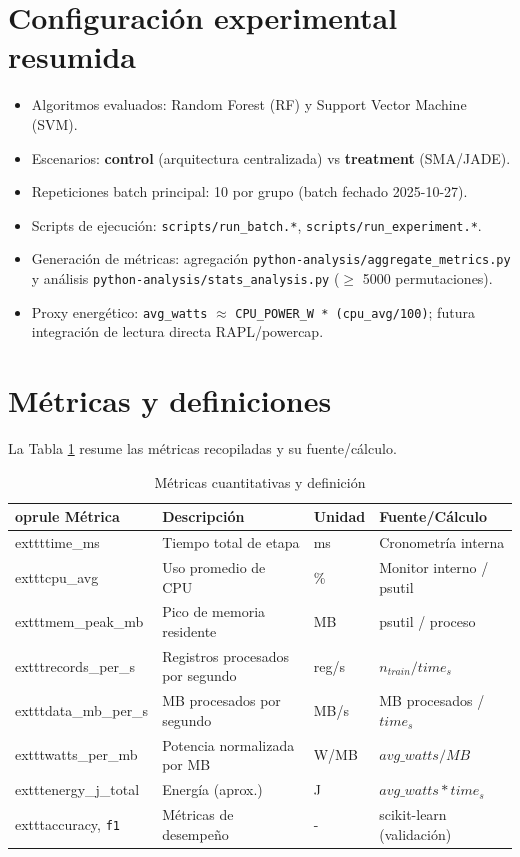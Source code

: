 \documentclass[12pt,oneside]{report}
\begin{document}
    \section{Configuración experimental resumida}
    \begin{itemize}
        \item Algoritmos evaluados: Random Forest (RF) y Support Vector Machine (SVM).
        \item Escenarios: \textbf{control} (arquitectura centralizada) vs \textbf{treatment} (SMA/JADE).
        \item Repeticiones batch principal: 10 por grupo (batch fechado 2025-10-27).
        \item Scripts de ejecución: \texttt{scripts/run\_batch.*}, \texttt{scripts/run\_experiment.*}.
        \item Generación de métricas: agregación \texttt{python-analysis/aggregate\_metrics.py} y análisis \texttt{python-analysis/stats\_analysis.py} (\(\ge\) 5000 permutaciones).
        \item Proxy energético: \texttt{avg\_watts} \(\approx\) \texttt{CPU\_POWER\_W * (cpu\_avg/100)}; futura integración de lectura directa RAPL/powercap.
    \end{itemize}

    \section{Métricas y definiciones}
    La Tabla \ref{tab:metricas-def} resume las métricas recopiladas y su fuente/cálculo.
    \begin{table}[htbp]
    \centering
    \caption{Métricas cuantitativas y definición}
    \label{tab:metricas-def}
    \begin{tabular}{l l l l}
    	oprule
    Métrica & Descripción & Unidad & Fuente/Cálculo \\
    \midrule
    	exttt{time\_ms} & Tiempo total de etapa & ms & Cronometría interna \\
    	exttt{cpu\_avg} & Uso promedio de CPU & \% & Monitor interno / psutil \\
    	exttt{mem\_peak\_mb} & Pico de memoria residente & MB & psutil / proceso \\
    	exttt{records\_per\_s} & Registros procesados por segundo & reg/s & \(n_{train}/time_{s}\) \\
    	exttt{data\_mb\_per\_s} & MB procesados por segundo & MB/s & MB procesados / \(time_s\) \\
    	exttt{watts\_per\_mb} & Potencia normalizada por MB & W/MB & \(avg\_watts / MB\) \\
    	exttt{energy\_j\_total} & Energía (aprox.) & J & \(avg\_watts * time_s\) \\
    	exttt{accuracy}, \texttt{f1} & Métricas de desempeño & - & scikit-learn (validación) \\
    \bottomrule
    \end{tabular}
    \end{table}
\end{document}
